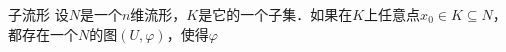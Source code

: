 

\begin{definition}{子流形}
设$N$是一个$n$维流形，$K$是它的一个子集．如果在$K$上任意点$x_0\in K\subseteq N$，都存在一个$N$的图$(U, \varphi)$，使得$\varphi $
\end{definition}




